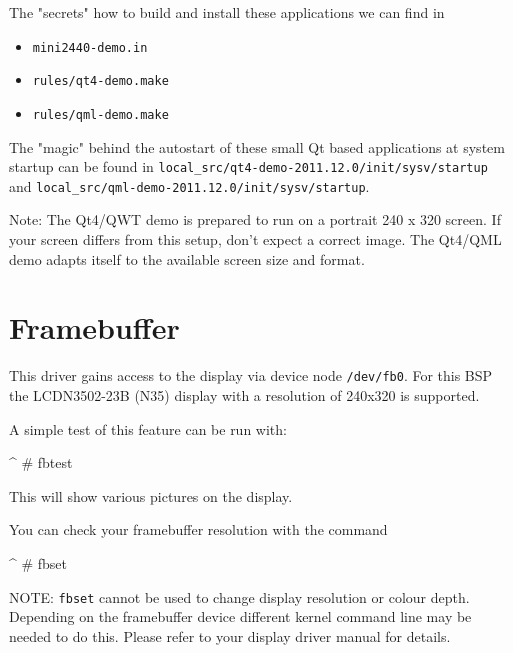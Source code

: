 The "secrets" how to build and install these applications we can find in

\begin{itemize}
	\item \texttt{mini2440-demo.in}
	\item \texttt{rules/qt4-demo.make}
	\item \texttt{rules/qml-demo.make}
\end{itemize}

The "magic" behind the autostart of these small Qt based applications at system
startup can be found in \texttt{local\_src/qt4-demo-2011.12.0/init/sysv/startup}
and \texttt{local\_src/qml-demo-2011.12.0/init/sysv/startup}.

Note: The Qt4/QWT demo is prepared to run on a portrait 240 x 320 screen. If
your screen differs from this setup, don't expect a correct image. The Qt4/QML
demo adapts itself to the available screen size and format.


\newcommand{\perDisplayName}{LCDN3502-23B (N35)}
\newcommand{\perDisplayRes}{240x320}

\section{Framebuffer}					\label{sec:fb}

This driver gains access to the display via device node \texttt{/dev/fb0}.
For this BSP the \perDisplayName{} display with a resolution of
\perDisplayRes{} is supported.

A simple test of this feature can be run with:

\begin{ptxshell}[escapechar=|]{^}
# fbtest
\end{ptxshell}

This will show various pictures on the display.

You can check your framebuffer resolution with the command
\begin{ptxshell}[escapechar=|]{^}
# fbset
\end{ptxshell}

NOTE: \texttt{fbset} cannot be used to change display resolution or colour depth.
Depending on the framebuffer device different kernel command line may be needed
to do this. Please refer to your display driver manual for details.



